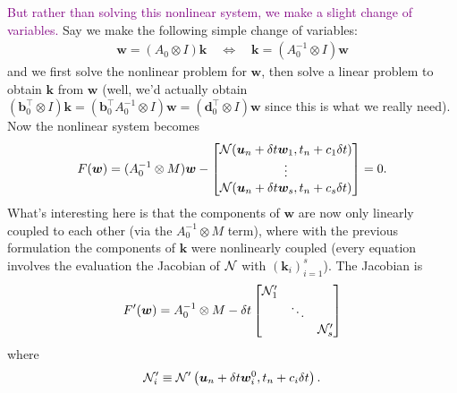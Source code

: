 \documentclass[review]{siamart}
\newcommand{\tcp}{\textcolor{purple}}
\begin{document}
%
%



\tcp{But rather than solving this nonlinear system, we make a slight change of variables.}
Say we make the following simple change of variables:
\begin{align}
\bm{w} = (A_0 \otimes I) \bm{k} 
\quad 
\Longleftrightarrow 
\quad
\bm{k} = (A_0^{-1} \otimes I) \bm{w}
\end{align}
and we first solve the nonlinear problem for $\bm{w}$, then solve a linear problem to obtain $\bm{k}$ from $\bm{w}$ (well, we'd actually obtain $(\bm{b}_0^\top \otimes I) \bm{k} = (\bm{b}_0^\top A_0^{-1} \otimes I) \bm{w} = (\bm{d}_0^\top \otimes I) \bm{w}$ since this is what we really need). Now the nonlinear system becomes
\begin{align}
F(\bm{w}) = ( A_0^{-1} \otimes M ) \bm{w} - 
\begin{bmatrix}
{\cal N}(\bm{u}_{n} + \delta t \bm{w}_1, t_n + c_1 \delta t)\\
\vdots\\
{\cal N}(\bm{u}_{n} + \delta t \bm{w}_s, t_n + c_s \delta t)\\
\end{bmatrix}
= 
0.
\end{align}
What's interesting here is that the components of $\bm{w}$ are now only linearly coupled to each other (via the $A_0^{-1} \otimes M$ term), where with the previous formulation the components of $\bm{k}$ were nonlinearly coupled (every equation involves the evaluation the Jacobian of ${\cal N}$ with $(\bm{k}_i)_{i =1}^s$). The Jacobian is
\begin{align}
F'(\bm{w}) = A_0^{-1} \otimes M - 
\delta t
\begin{bmatrix} {\cal N}'_1 \\ 
& \ddots \\ 
& & {\cal N}'_s
\end{bmatrix}
\end{align}
where
\begin{align}
{\cal N}'_i \equiv {\cal N}' \left(\bm{u}_n + \delta t \bm{w}_i^0, t_n + c_i \delta t \right).
\end{align}
\end{document}
